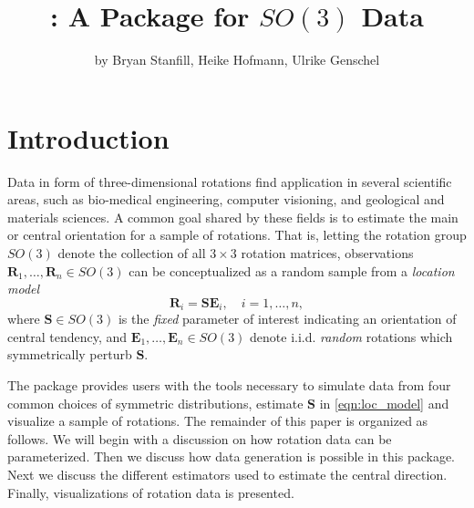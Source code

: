 

\title{: A Package for $SO(3)$ Data}
\author{by Bryan Stanfill, Heike Hofmann, Ulrike Genschel}

\maketitle



\section{Introduction}

Data in form of three-dimensional rotations find application in several scientific areas, such as bio-medical engineering, computer visioning, and geological and materials sciences.  A common goal shared by these fields is to estimate the main or central orientation for a sample of rotations.  That is, letting the rotation group $SO(3)$ denote the collection of all $3\times 3$ rotation matrices, observations $\bm{R}_1,\ldots,\bm{R}_n \in SO(3)$ can be conceptualized as a random sample from a \textit{location model}
\begin{equation}
\label{eqn:loc_model}
\mathbf{R}_i = \bm{S} \bm{E}_i, \quad i=1,\ldots,n,
\end{equation}
where $\bm S \in SO(3)$ is the {\it fixed} parameter of interest indicating an orientation of central tendency, and $\bm{E}_1,\ldots,\bm{E}_n \in SO(3)$ denote i.i.d. {\it random} rotations which symmetrically perturb $\bm{S}$.

The  package provides users with the tools necessary to simulate data from four common choices of symmetric distributions, estimate $\bm{S}$ in \eqref{eqn:loc_model} and visualize a sample of rotations.  The remainder of this paper is organized as follows.  We will begin with a discussion on how rotation data can be parameterized.  Then we discuss how data generation is possible in this package.  Next we discuss the different estimators used to estimate the central direction.  Finally, visualizations of rotation data is presented.

